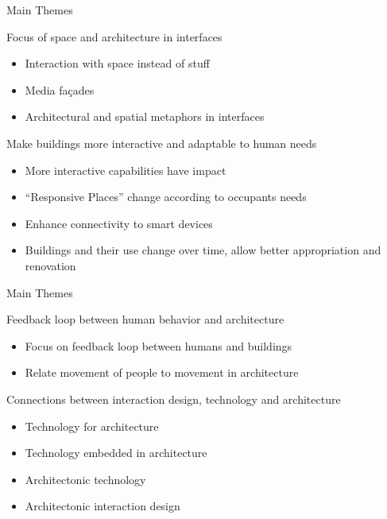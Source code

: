 \documentclass[10pt]{beamer}
\begin{document}
\begin{frame}{Main Themes}
	\begin{block}{Focus of space and architecture in interfaces}
	\begin{itemize}
        \pause{}
		\item Interaction with space instead of stuff
        \pause{}
		\item Media fa\c{c}ades
        \pause{}
		\item Architectural and spatial metaphors in interfaces
    \end{itemize}	
	\end{block}

    \pause{}
	\begin{block}{Make buildings more interactive and adaptable to human needs}
	\begin{itemize}
        \pause{}
		\item More interactive capabilities have impact
        \pause{}
		\item ``Responsive Places'' change according to occupants needs
        \pause{}
        \item Enhance connectivity to smart devices
        \pause{}
        \item Buildings and their use change over time, allow better appropriation and renovation
	\end{itemize}	
	\end{block}
\end{frame}




\begin{frame}{Main Themes}
	\begin{block}{Feedback loop between human behavior and architecture}
	\begin{itemize}
        \pause{}
		\item Focus on feedback loop between humans and buildings
        \pause{}
		\item Relate movement of people to movement in architecture
	\end{itemize}	
	\end{block}

    \pause{}
	\begin{block}{Connections between interaction design, technology and architecture}
	\begin{itemize}
        \pause{}
		\item Technology for architecture
        \pause{}
		\item Technology embedded in architecture
        \pause{}
		\item Architectonic technology
        \pause{}
        \item Architectonic interaction design
	\end{itemize}	
	\end{block}
\end{frame}
\end{document}
